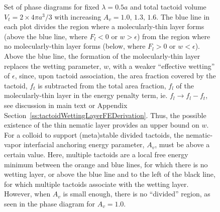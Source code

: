 \documentclass[%
 aip,
 amsmath,amssymb,
 reprint,%
]{revtex4-1}
\begin{document}
\begin{figure}
\caption{Set of phase diagrams for fixed $\lambda=0.5 a$ and total tactoid volume $V_t=2\times 4\pi a^3/3$ with increasing $A_v=1.0 ,\, 1.3,\, 1.6$. The blue line in each plot divides the region where a molecularly-thin layer forms (above the blue line, where $F_{l}<0$ or $w>\epsilon$) from the region where no molecularly-thin layer forms (below, where $F_{l}>0$ or $w<\epsilon$). Above the blue line, the formation of the molecularly-thin layer replaces the wetting parameter, $w$, with a weaker ``effective wetting'' of $\epsilon$, since, upon tactoid association, the area fraction covered by the tactoid, $f_t$ is subtracted from the total area fraction, $f_{l}$ of the molecularly-thin layer in the energy penalty term, ie. $f_{l} \to f_{l} - f_t$, see discussion in main text or Appendix Section~\ref{ss:tactoidWettingLayerFEDerivation}. Thus, the possible existence of the thin nematic layer provides an upper bound on $w$. For a colloid to support (meta)stable divided tactoids, the nematic-vapor interfacial anchoring energy parameter, $A_v$, must be above a certain value. Here, multiple tactoids are a local free energy minimum between the orange and blue lines, for which there is no wetting layer, or above the blue line and to the left of the black line, for which multiple tactoids associate with the wetting layer. However, when $A_v$ is small enough, there is no ``divided'' region, as seen in the phase diagram for $A_v=1.0$.}
\label{fig:tactoidTheoryPhaseDiag}
\end{figure}
\end{document}
